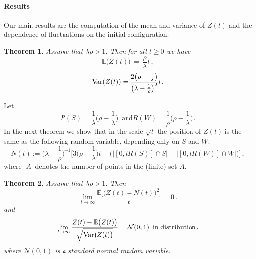 \documentclass[reqno, 12pt]{amsart}
\newtheorem{theorem}{Theorem}
\begin{document}
\paragraph{\bf Results} Our main results are the computation of the mean and
variance of $Z(t)$ and the dependence of fluctuations on the initial
configuration.

\begin{theorem}\label{2class-mean&var}
Assume that $\lambda\rho>1$. Then for all $t\geq 0$ we have
\begin{equation}\label{2class-mean}
{{\mathbb E}}\big(Z(t)\big)\,=\,\frac{\rho}{\lambda}t\,,
\end{equation}
\begin{equation}\label{2class-var}
{{\rm Var}}(Z(t))=  \frac{2\big(\rho-\frac{1}{\lambda}\big)}{\big(\lambda-\frac{1}{\rho}\big)^{2}}t\,.
\end{equation}
\end{theorem}

Let
$$
R(S)=\frac{1}{\lambda}\Big(\rho-\frac{1}{\lambda}\Big)\,\mbox{ and
}R(W)=\frac{1}{\rho}\Big(\rho-\frac{1}{\lambda}\Big)\,.
$$
In the next theorem we show that in the
scale $\sqrt t$ the position of $Z(t)$ is the same as the following random
variable, depending only on $S$ and $W$:
$$
N(t):=\big(\lambda-\frac{1}{\rho}\big)^{-1}\Big[3\Big(\rho-\frac{1}{\lambda}\Big)
t-\Big(\big|[0,tR(S)]\cap S\big|+\big|[0,tR(W)]\cap W\big|
\Big)\Big]\,,
$$
where $|A|$ denotes the number of points in the (finite) set $A$.

\begin{theorem}\label{dependence}
Assume that $\lambda\rho>1$. Then
\[
\lim_{t\to\infty}  \frac{{{\mathbb E}}\Big[\big(Z(t)-N(t)\big)^2\Big]}{t} =0\,.
\]
and
\[
\lim_{t\to\infty}  \frac{Z(t)-{{\mathbb E}}\big(Z(t)\big)}{\sqrt{{{\rm Var}} \big(Z(t)\big)}}= \mathcal
N(0,1)\,\mbox{ in distribution}\,,
\]
where $\mathcal N(0,1)$ is a standard normal random variable.\end{theorem}
\end{document}
